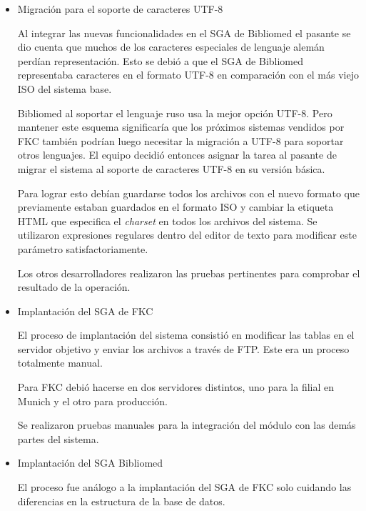 \begin{itemize}

\item Migración para el soporte de caracteres UTF-8

Al integrar las nuevas funcionalidades en el SGA de Bibliomed el pasante se dio cuenta que muchos de los caracteres especiales de lenguaje alemán perdían representación. Esto se debió a que el SGA de Bibliomed representaba caracteres en el formato UTF-8 en comparación con el más viejo ISO del sistema base.

Bibliomed al soportar el lenguaje ruso usa la mejor opción UTF-8. Pero mantener este esquema significaría que los próximos sistemas vendidos por FKC también podrían luego necesitar la migración a UTF-8 para soportar otros lenguajes. El equipo decidió entonces asignar la tarea al pasante de migrar el sistema al soporte de caracteres UTF-8 en su versión básica.

Para lograr esto debían guardarse todos los archivos con el nuevo formato que previamente estaban guardados en el formato ISO y cambiar la etiqueta HTML que especifica el \emph{charset} en todos los archivos del sistema. Se utilizaron expresiones regulares dentro del editor de texto para modificar este parámetro satisfactoriamente.

Los otros desarrolladores realizaron las pruebas pertinentes para comprobar el resultado de la operación.

\item Implantación del SGA de FKC

El proceso de implantación del sistema consistió en modificar las tablas en el servidor objetivo y enviar los archivos a través de FTP. Este era un proceso totalmente manual.

Para FKC debió hacerse en dos servidores distintos, uno para la filial en Munich y el otro para producción.

Se realizaron pruebas manuales para la integración del módulo con las demás partes del sistema.

\item Implantación del SGA Bibliomed

El proceso fue análogo a la implantación del SGA de FKC solo cuidando las diferencias en la estructura de la base de datos.

\end{itemize}


